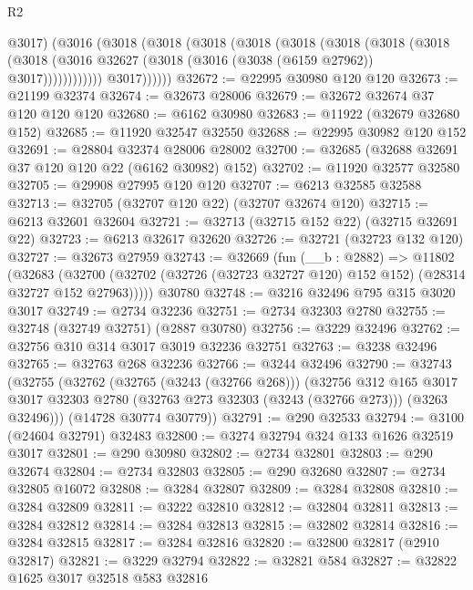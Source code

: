 \begin{lexlean}{R2}
\begin{coremodule}
                @3017)
              (@3016
                (@3018
                  (@3018
                    (@3018
                      (@3018
                        (@3018
                          (@3018
                            (@3018
                              (@3018
                                (@3018
                                  (@3016
                                    @32627
                                    (@3018 (@3016 (@3038 (@6159 @27962)) @3017))))))))))))
                @3017))))))
@32672 := @22995 @30980 @120 @120
@32673 := @21199 @32374
@32674 := @32673 @28006
@32679 := @32672 @32674 @37 @120 @120 @120
@32680 := @6162 @30980
@32683 := @11922 (@32679 @32680 @152)
@32685 := @11920 @32547 @32550
@32688 := @22995 @30982 @120 @152
@32691 := @28804 @32374 @28006 @28002
@32700 := @32685 (@32688 @32691 @37 @120 @120 @22 (@6162 @30982) @152)
@32702 := @11920 @32577 @32580
@32705 := @29908 @27995 @120 @120
@32707 := @6213 @32585 @32588
@32713 := @32705 (@32707 @120 @22) (@32707 @32674 @120)
@32715 := @6213 @32601 @32604
@32721 := @32713 (@32715 @152 @22) (@32715 @32691 @22)
@32723 := @6213 @32617 @32620
@32726 := @32721 (@32723 @132 @120)
@32727 := @32673 @27959
@32743 := @32669
    (fun (__b : @2882) =>
    @11802
      (@32683
        (@32700 (@32702 (@32726 (@32723 @32727 @120) @152 @152) (@28314 @32727 @152 @27963)))))
    @30780
@32748 := @3216 @32496 @795 @315 @3020 @3017
@32749 := @2734 @32236
@32751 := @2734 @32303 @2780
@32755 := @32748 (@32749 @32751) (@2887 @30780)
@32756 := @3229 @32496
@32762 := @32756 @310 @314 @3017 @3019 @32236 @32751
@32763 := @3238 @32496
@32765 := @32763 @268 @32236
@32766 := @3244 @32496
@32790 := @32743
    (@32755
      (@32762
        (@32765 (@3243 (@32766 @268)))
        (@32756
          @312
          @165
          @3017
          @3017
          @32303
          @2780
          (@32763 @273 @32303 (@3243 (@32766 @273)))
          (@3263 @32496)))
      (@14728 @30774 @30779))
@32791 := @290 @32533
@32794 := @3100 (@24604 @32791) @32483
@32800 := @3274 @32794 @324 @133 @1626 @32519 @3017
@32801 := @290 @30980
@32802 := @2734 @32801
@32803 := @290 @32674
@32804 := @2734 @32803
@32805 := @290 @32680
@32807 := @2734 @32805 @16072
@32808 := @3284 @32807
@32809 := @3284 @32808
@32810 := @3284 @32809
@32811 := @3222 @32810
@32812 := @32804 @32811
@32813 := @3284 @32812
@32814 := @3284 @32813
@32815 := @32802 @32814
@32816 := @3284 @32815
@32817 := @3284 @32816
@32820 := @32800 @32817 (@2910 @32817)
@32821 := @3229 @32794
@32822 := @32821 @584
@32827 := @32822 @1625 @3017 @32518 @583 @32816

\end{coremodule}
\end{lexlean}
